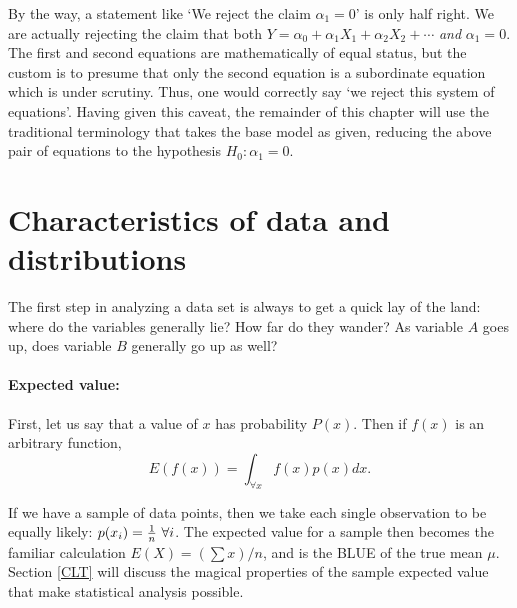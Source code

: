 By the way, a statement like `We reject
the claim $\alpha_1=0$' is only half right. We are actually rejecting
the claim that both
$Y = \alpha_0 + \alpha_1 X_1 + \alpha_2 X_2 + \cdots$ {\em and}
$\alpha_1=0$. 
The first and second equations are mathematically of equal
status, but the custom is to presume that only the second equation is a
subordinate equation which is under scrutiny. Thus, one would correctly
say `we reject this system of equations'. Having given this caveat, the
remainder of this chapter will use the traditional terminology that
takes the base model as given, reducing
the above pair of equations to the hypothesis $H_0: \alpha_1=0$.



\section{Characteristics of data and distributions}\label{basicstats}
The first step in analyzing a data set is always to get a quick lay of
the land: where do the variables generally lie? How far do they wander?
As variable $A$ goes up, does variable $B$ generally go up as well?

\paragraph{Expected value:} 
First, let us say that a value of $x$ has probability $P(x)$. Then
if $f(x)$ is an arbitrary function, 
$$E\left(f(x)\right)=\int_{\forall x} f(x)p(x) dx.$$

If we have a sample of data points, then we take each single observation
to be equally likely: $p(x_i)={1\over n}\ \forall i$.
The expected value for a sample then becomes the familiar calculation
$E(X)=(\sum x)/n$, and is the BLUE of
the true mean $\mu$. Section \ref{CLT} will discuss the magical properties of the
sample expected value that make statistical analysis possible.


